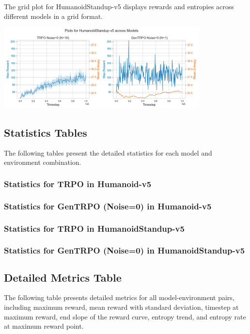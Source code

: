 \documentclass{svproc}
\begin{document}
The grid plot for HumanoidStandup-v5 displays rewards and entropies across different models in a grid format.

\begin{center}
\includegraphics[width=0.8\textwidth]{grid_env_HumanoidStandup-v5.png}
\end{center}

\subsection{Statistics Tables}
The following tables present the detailed statistics for each model and environment combination.

\subsubsection{Statistics for TRPO in Humanoid-v5}


\subsubsection{Statistics for GenTRPO (Noise=0) in Humanoid-v5}


\subsubsection{Statistics for TRPO in HumanoidStandup-v5}


\subsubsection{Statistics for GenTRPO (Noise=0) in HumanoidStandup-v5}


\subsection{Detailed Metrics Table}
The following table presents detailed metrics for all model-environment pairs, including maximum reward, mean reward with standard deviation, timestep at maximum reward, end slope of the reward curve, entropy trend, and entropy rate at maximum reward point.
\end{document}
